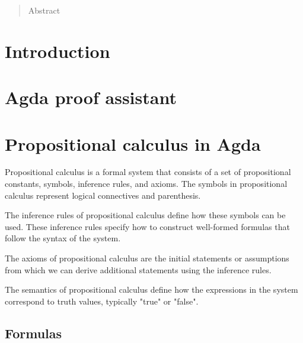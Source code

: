 \documentclass[titlepage]{article}
\begin{document}

\begin{abstract}
    Abstract
\end{abstract}

\tableofcontents
\thispagestyle{empty}
\newpage
\setcounter{page}{1}



\section{Introduction}




\section{Agda proof assistant}






\section{Propositional calculus in Agda}
Propositional calculus is a formal system that consists of a set of propositional constants, symbols, inference rules, and axioms. The symbols in propositional calculus represent logical connectives and parenthesis.

The inference rules of propositional calculus define how these symbols can be used. These inference rules specify how to construct well-formed formulas that follow the syntax of the system.

The axioms of propositional calculus are the initial statements or assumptions from which we can derive additional statements using the inference rules.

The semantics of propositional calculus define how the expressions in the system correspond to truth values, typically "true" or "false".



\subsection{Formulas}
\end{document}
